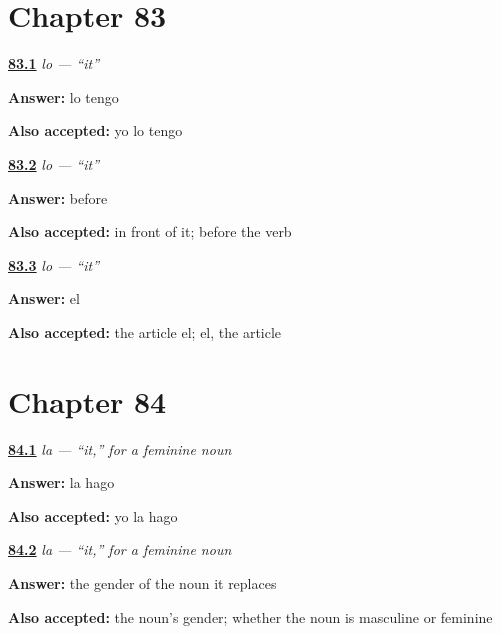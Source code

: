 \section*{Chapter 83}

\noindent\begin{minipage}[t]{\linewidth}
\raggedright
\hyperlink{review-ES-C42-lo-replace}{\textbf{83.1}} \emph{lo — \textquotedblleft{}it\textquotedblright{}}\par
\small \textbf{Answer:} lo tengo\par
\footnotesize \textbf{Also accepted:} yo lo tengo
\end{minipage}\par\medskip

\noindent\begin{minipage}[t]{\linewidth}
\raggedright
\hyperlink{review-ES-C42-lo-place}{\textbf{83.2}} \emph{lo — \textquotedblleft{}it\textquotedblright{}}\par
\small \textbf{Answer:} before\par
\footnotesize \textbf{Also accepted:} in front of it; before the verb
\end{minipage}\par\medskip

\noindent\begin{minipage}[t]{\linewidth}
\raggedright
\hyperlink{review-ES-C42-lo-origin}{\textbf{83.3}} \emph{lo — \textquotedblleft{}it\textquotedblright{}}\par
\small \textbf{Answer:} el\par
\footnotesize \textbf{Also accepted:} the article el; el, the article
\end{minipage}\par\medskip

\section*{Chapter 84}

\noindent\begin{minipage}[t]{\linewidth}
\raggedright
\hyperlink{review-ES-C42-la-form}{\textbf{84.1}} \emph{la — \textquotedblleft{}it,\textquotedblright{} for a feminine noun}\par
\small \textbf{Answer:} la hago\par
\footnotesize \textbf{Also accepted:} yo la hago
\end{minipage}\par\medskip

\noindent\begin{minipage}[t]{\linewidth}
\raggedright
\hyperlink{review-ES-C42-la-agree}{\textbf{84.2}} \emph{la — \textquotedblleft{}it,\textquotedblright{} for a feminine noun}\par
\small \textbf{Answer:} the gender of the noun it replaces\par
\footnotesize \textbf{Also accepted:} the noun's gender; whether the noun is masculine or feminine
\end{minipage}\par\medskip

